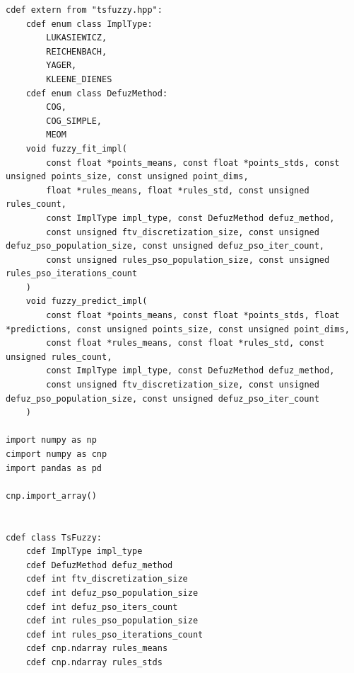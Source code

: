 \begin{verbatim}
cdef extern from "tsfuzzy.hpp":
    cdef enum class ImplType:
        LUKASIEWICZ,
        REICHENBACH,
        YAGER,
        KLEENE_DIENES
    cdef enum class DefuzMethod:
        COG,
        COG_SIMPLE,
        MEOM
    void fuzzy_fit_impl(
        const float *points_means, const float *points_stds, const unsigned points_size, const unsigned point_dims,
        float *rules_means, float *rules_std, const unsigned rules_count,
        const ImplType impl_type, const DefuzMethod defuz_method,
        const unsigned ftv_discretization_size, const unsigned defuz_pso_population_size, const unsigned defuz_pso_iter_count,
        const unsigned rules_pso_population_size, const unsigned rules_pso_iterations_count
    )
    void fuzzy_predict_impl(
        const float *points_means, const float *points_stds, float *predictions, const unsigned points_size, const unsigned point_dims,
        const float *rules_means, const float *rules_std, const unsigned rules_count,
        const ImplType impl_type, const DefuzMethod defuz_method,
        const unsigned ftv_discretization_size, const unsigned defuz_pso_population_size, const unsigned defuz_pso_iter_count
    )

import numpy as np
cimport numpy as cnp
import pandas as pd

cnp.import_array()


cdef class TsFuzzy:
    cdef ImplType impl_type
    cdef DefuzMethod defuz_method
    cdef int ftv_discretization_size
    cdef int defuz_pso_population_size
    cdef int defuz_pso_iters_count
    cdef int rules_pso_population_size
    cdef int rules_pso_iterations_count
    cdef cnp.ndarray rules_means
    cdef cnp.ndarray rules_stds


\end{verbatim}
